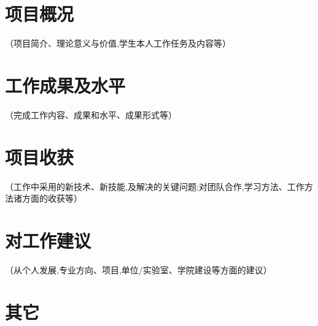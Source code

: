 \section{项目概况}

（项目简介、理论意义与价值,学生本人工作任务及内容等）

\section{工作成果及水平}

（完成工作内容、成果和水平、成果形式等）

\section{项目收获}

（工作中采用的新技术、新技能,及解决的关键问题;对团队合作,学习方法、工作方法诸方面的收获等）

\section{对工作建议}

（从个人发展,专业方向、项目,单位/实验室、学院建设等方面的建议）

\section{其它}
